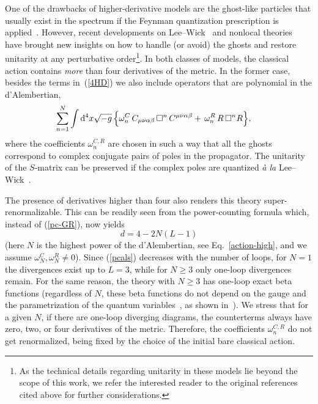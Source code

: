 \documentclass[aps,prd,a4paper,twocolumn,showpacs,showkeys,preprintnumbers,amsmath,amssymb,nofootinbib,usenames,dvipsnames]{revtex4-2}
\newcommand{\be}{\begin{eqnarray}}
\def\beq{\begin{equation}}
\def\eeq{\end{equation}}
\newcommand{\rd}{\mathrm{d}}  %
\newcommand{\eq}[1]{(\ref{#1})}
\newcommand{\n}[1]{\label{#1}}
\def\al{\alpha}
\def\be{\beta}
\def\om{\omega}
\begin{document}
One of the drawbacks of higher-derivative models are the ghost-like particles that usually exist in the spectrum if the Feynman quantization prescription is applied~\cite{Stelle77}. However,  recent developments on Lee--Wick~\cite{AsoreyLopezShapiro,ModestoShapiro16,Modesto16,AnselmiPiva1,AnselmiPiva2,AnselmiPiva3,Anselmi:2017ygm} and nonlocal theories~\cite{Krasnikov,Kuzmin,Tomboulis,Modesto12} have brought new insights on how to handle (or avoid) the ghosts and restore unitarity at any perturbative order\footnote{As the technical details regarding unitarity in these models lie beyond the scope of this work, we  refer the interested reader to the original references cited above for further considerations.}.
In both classes of models, the classical action contains \textit{more} than four derivatives of the metric.
In the former case, besides the terms in~\eq{4HD} we also include operators that are polynomial in the d'Alembertian,
\begin{eqnarray}
\hspace{-0.5 cm}  
\,\sum_{n=1}^{N} \int \rd^4 x \sqrt{-g} \,
\Big\{
\om_{n}^C \, C_{\mu\nu\al\be}\, \square^n\,C^{\mu\nu\al\be}
+ \, \om_{n}^R \, R \, \square^{n} R
\Big\},
\label{action-high}
\end{eqnarray}
where the coefficients $\om_{n}^{C,R}$ are chosen in such a way that all the
ghosts correspond to complex conjugate pairs of poles in the propagator. The unitarity of the $S$-matrix can be preserved if the complex poles are quantized {\it \`a la} Lee--Wick~\cite{AnselmiPiva2,LW1,LW2,CLOP}.

The presence of derivatives higher than four also renders this theory super-renormalizable. This can be readily seen from the power-counting formula which, instead of \eq{pc-GR}, now yields \cite{AsoreyLopezShapiro} 
\beq
\n{pcals}
d = 4 - 2 N (L-1)
\eeq 
(here $N$ is the highest power of the d'Alembertian, see Eq.~\eqref{action-high}, and we assume $\om_{N}^C, \om_{N}^R \neq 0$). Since \eq{pcals}
decreases with the number of loops, for $N = 1$ the divergences exist up to $L = 3$, while for $N \geqslant 3$ only one-loop divergences remain.  For the same reason, the theory with $N \geqslant 3$ has one-loop exact beta functions (regardless of $N$, these beta functions do not depend on the gauge and the parametrization of the quantum variables~\cite{AsoreyLopezShapiro}, as shown in~\cite{AsoreyLopezShapiro,Modesto:2017hzl,Rachwal:2021bgb}). 
We stress that for a given $N$, if there are one-loop diverging diagrams, the counterterms always have zero, two, or four derivatives of the metric. Therefore, the coefficients $\om_{n}^{C,R}$ do not get renormalized, being fixed by the choice of the initial bare classical action.
\end{document}
